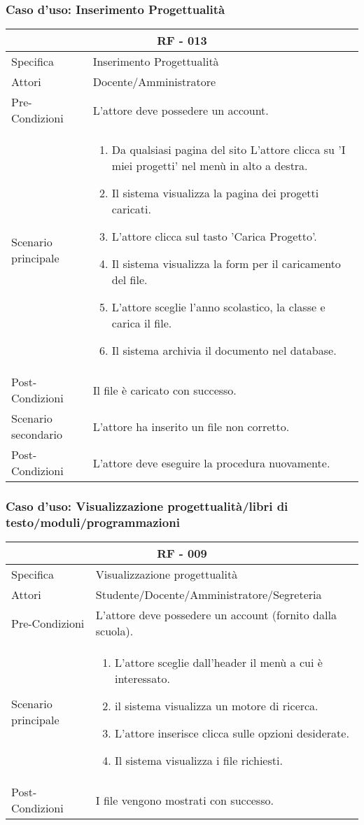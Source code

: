 \documentclass{article}
\begin{document}
\subsubsection{\textbf{Caso d'uso: Inserimento Progettualità}}
\begin{tabular}{ |p{3cm}|p{9cm}|  }
	\hline
	\multicolumn{2}{|c|}{\textbf{RF - 013}} \\
	\hline
	Specifica& Inserimento Progettualità\\
	\hline
	Attori& Docente/Amministratore\\
	\hline
	Pre-Condizioni& L'attore deve possedere un account.\\
	\hline
	Scenario principale& \begin{enumerate}
		\item Da qualsiasi pagina del sito L'attore clicca su 'I miei progetti' nel menù in alto a destra.
		\item Il sistema visualizza la pagina dei progetti caricati.
		\item L'attore clicca sul tasto 'Carica Progetto'.
		\item Il sistema visualizza la form per il caricamento del file.
		\item L'attore sceglie l'anno scolastico, la classe e carica il file.
		\item Il sistema archivia il documento nel database.
	\end{enumerate}\\
	\hline
	Post-Condizioni& Il file è caricato con successo.\\
	\hline
	Scenario secondario& L'attore ha inserito un file non corretto.\\
	\hline
	Post-Condizioni& L'attore deve eseguire la procedura nuovamente.\\
	\hline
\end{tabular}
\subsubsection{\textbf{Caso d'uso: Visualizzazione progettualità/libri di testo/moduli/programmazioni}}
\begin{tabular}{ |p{3cm}|p{9cm}|  }
	\hline
	\multicolumn{2}{|c|}{\textbf{RF - 009}} \\
	\hline
	Specifica& Visualizzazione progettualità\\
	\hline
	Attori& Studente/Docente/Amministratore/Segreteria\\
	\hline
	Pre-Condizioni& L'attore deve possedere un account (fornito dalla scuola).\\
	\hline
	Scenario principale& \begin{enumerate}
		\item L'attore sceglie dall'header il menù a cui è interessato.
		\item il sistema visualizza un motore di ricerca.
		\item L'attore inserisce clicca sulle opzioni desiderate.
		\item Il sistema visualizza i file richiesti.
	\end{enumerate}\\
	\hline
	Post-Condizioni& I file vengono mostrati con successo.\\
	\hline
\end{tabular}
\end{document}
